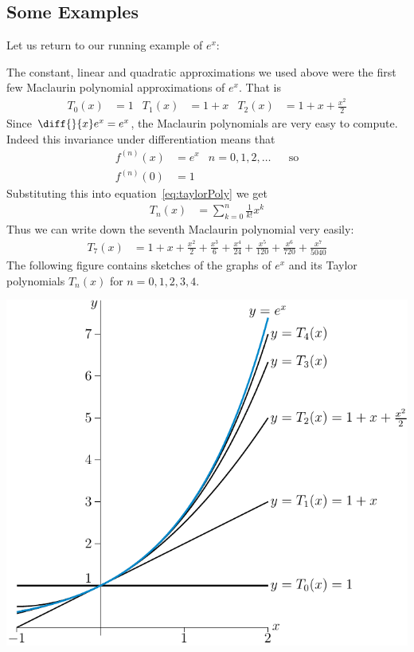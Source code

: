 \subsection{Some Examples}\label{ssec_taylor_eg}
Let us return to our running example of $e^x$:
\begin{eg}\label{eg taylor e to the x}
 The constant, linear and quadratic approximations we used above were the first few
Maclaurin polynomial approximations of $e^x$. That is
\begin{align*}
  T_0 (x) & = 1 & T_1(x) &= 1+x & T_2(x) &= 1+x+\frac{x^2}{2}
\end{align*}
Since $\diff{}{x} e^x = e^x$, the Maclaurin polynomials are very easy to compute.
Indeed this invariance under differentiation means that
\begin{align*}
  f^{(n)}(x) &= e^x & n=0,1,2,\dots && \text{so}\\
  f^{(n)}(0) &= 1
\end{align*}
Substituting this into equation~\eqref{eq:taylorPoly} we get
\begin{align*}
  T_n(x) &= \sum_{k=0}^n \frac{1}{k!} x^k
\end{align*}
Thus we can write down the seventh Maclaurin polynomial very easily:
\begin{align*}
  T_7(x) &= 1 + x + \frac{x^2}{2} + \frac{x^3}{6} + \frac{x^4}{24} + \frac{x^5}{120} +
\frac{x^6}{720} + \frac{x^7}{5040}
\end{align*}
The following figure contains sketches of the graphs of $e^x$ and its Taylor 
polynomials $T_n(x)$ for $n=0,1,2,3,4$.
\begin{efig}
\begin{center}
   \includegraphics{expT}

\end{center}
\end{efig}
\end{eg}
